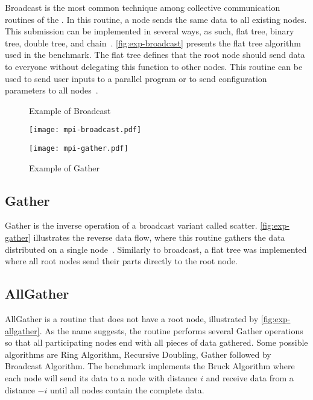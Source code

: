 			Broadcast is the most common technique among collective communication
			routines of the \mpi. In this routine, a node sends the same data to
			all existing nodes. This submission can be implemented in several ways,
			as such, flat tree, binary tree, double tree, and chain~\cite{mpi-survey}.
			\autoref{fig:exp-broadcast} presents the flat tree algorithm used in
			the benchmark. The flat tree defines that the root node should send
			data to everyone without delegating this function to other nodes.
			This routine can be used to send user inputs to a parallel program
			or to send configuration parameters to all nodes~\cite{url:mpitutorial}.

			\begin{figure}[!tb]
				\centering

				\begin{minipage}{.4\textwidth}
					\centering%
					\caption{Example of \mpi Broadcast}%
					\label{fig:exp-broadcast}%
					\texttt{[image: mpi-broadcast.pdf]}%
				\end{minipage}%
				\hspace{1cm}%
				\begin{minipage}{.4\textwidth}
					\centering%
					\caption{Example of \mpi Gather}%
					\label{fig:exp-gather}%
					\texttt{[image: mpi-gather.pdf]}%
				\end{minipage}%

			\end{figure}

		\subsection{Gather}

			Gather is the inverse operation of a broadcast variant called scatter.
			\autoref{fig:exp-gather} illustrates the reverse data flow, where this
			routine gathers the data distributed on a single node~\cite{url:mpitutorial}.
			Similarly to broadcast, a flat tree was implemented where all root
			nodes send their parts directly to the root node.

		\subsection{AllGather}

			AllGather is a routine that does not have a root node, illustrated by
			\autoref{fig:exp-allgather}. As the name suggests, the routine performs
			several Gather operations so that all participating nodes end with all
			pieces of data gathered. Some possible algorithms are Ring Algorithm,
			Recursive Doubling, Gather followed by Broadcast Algorithm. The benchmark
			implements the Bruck Algorithm where each node will send its data to a node
			with distance $i$ and receive data from a distance $-i$ until all nodes
			contain the complete data.
			
